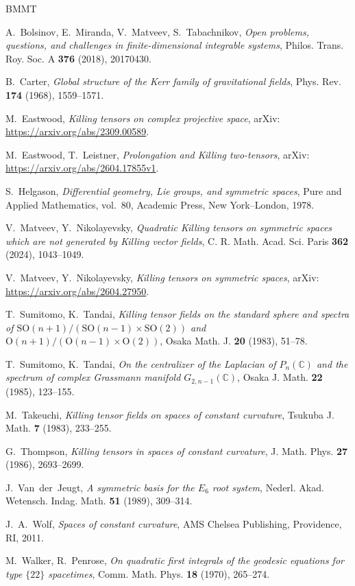 \documentclass[12pt,reqno]{amsart}
\newcommand \bc{\mathbb{C}}
\newcommand \SO{\mathrm{SO}}
\newcommand \<{\langle}
\renewcommand \>{\rangle}
\theoremstyle{definition}
\theoremstyle{remark}
\begin{document}
	\begin{thebibliography}{BMMT}
		
		A.~Bolsinov, E.~Miranda, V.~Matveev, S.~Tabachnikov, \emph{Open problems, questions, and challenges in finite-dimensional integrable systems}, Philos. Trans. Roy. Soc. A \textbf{376} (2018), 20170430.
		
		B.~Carter, \emph{Global structure of the Kerr family of gravitational fields}, Phys. Rev. \textbf{174} (1968), 1559--1571.
				
		M.~Eastwood, \emph{Killing tensors on complex projective space}, arXiv: \url{https://arxiv.org/abs/2309.00589}.
		
		M.~Eastwood, T.~Leistner, \emph{Prolongation and Killing two-tensors}, arXiv: \url{https://arxiv.org/abs/2604.17855v1}.
		
		S.~Helgason, \emph{Differential geometry, Lie groups, and symmetric spaces}, Pure and Applied Mathematics, vol.~80, Academic Press, New York--London, 1978.
		
		V.~Matveev, Y.~Nikolayevsky, \emph{Quadratic Killing tensors on symmetric spaces which are not generated by Killing vector fields}, C. R. Math. Acad. Sci. Paris \textbf{362} (2024), 1043--1049.
		
		V.~Matveev, Y.~Nikolayevsky, \emph{Killing tensors on symmetric spaces}, arXiv: \url{https://arxiv.org/abs/2604.27950}.
				
		T.~Sumitomo, K.~Tandai, \emph{Killing tensor fields on the standard sphere and spectra of $\SO(n+1)/(\SO(n-1)\times \SO(2))$ and $\mathrm{O}(n+1)/(\mathrm{O}(n-1)\times \mathrm{O}(2))$}, Osaka Math. J. \textbf{20} (1983), 51--78.
		
		T.~Sumitomo, K.~Tandai, \emph{On the centralizer of the Laplacian of $P_n(\bc)$ and the spectrum of complex Grassmann manifold $G_{2,n-1}(\bc)$}, Osaka J. Math. \textbf{22} (1985), 123--155.
		
		M.~Takeuchi, \emph{Killing tensor fields on spaces of constant curvature}, Tsukuba J. Math. \textbf{7} (1983), 233--255.
		
		G.~Thompson, \emph{Killing tensors in spaces of constant curvature}, J. Math. Phys. \textbf{27} (1986), 2693--2699.
		
        J.~Van~der~Jeugt, \emph{A symmetric basis for the $E_6$ root system}, Nederl. Akad. Wetensch. Indag. Math. \textbf{51} (1989), 309--314.

		J.~A.~Wolf, \emph{Spaces of constant curvature}, AMS Chelsea Publishing, Providence, RI, 2011.
		
		M.~Walker, R.~Penrose, \emph{On quadratic first integrals of the geodesic equations for type $\{22\}$ spacetimes}, Comm. Math. Phys. \textbf{18} (1970), 265--274.
				
	\end{thebibliography}
	
\end{document}
